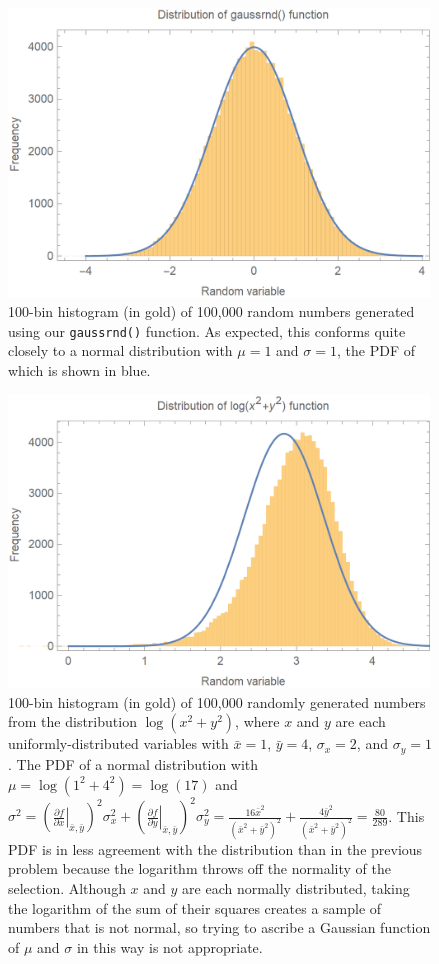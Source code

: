 \documentclass{article}
\begin{document}
\begin{figure}[H]
    \centering
    \includegraphics[width=4.4in]{homework7/normal_dist.png}
    \caption{100-bin histogram (in gold) of 100,000 random numbers generated using our \texttt{gaussrnd()} function. As expected, this conforms quite closely to a normal distribution with $\mu=1$ and $\sigma=1$, the PDF of which is shown in blue.}
    \label{fig:gaussrnd}
\end{figure}

\newpage

\bigskip
{}
\medskip

\begin{figure}[H]
    \centering
    \includegraphics[width=4.4in]{homework7/log_dist.png}
    \caption{100-bin histogram (in gold) of 100,000 randomly generated numbers from the distribution $\log(x^2+y^2)$, where $x$ and $y$ are each uniformly-distributed variables with $\bar{x}=1$, $\bar{y}=4$, $\sigma_x=2$, and $\sigma_y=1$. The PDF of a normal distribution with $\mu=\log(1^2+4^2)=\log(17)$ and $\displaystyle \sigma^2=\left(\left.\frac{\partial f}{\partial x}\right|_{\bar{x},\bar{y}}\right)^2\sigma_x^2 + \left(\left.\frac{\partial f}{\partial y}\right|_{\bar{x},\bar{y}}\right)^2\sigma_y^2 = \frac{16\bar{x}^2}{(\bar{x}^2+\bar{y}^2)^2}+\frac{4\bar{y}^2}{(\bar{x}^2+\bar{y}^2)^2}=\frac{80}{289}$. This PDF is in less agreement with the distribution than in the previous problem because the logarithm throws off the normality of the selection. Although $x$ and $y$ are each normally distributed, taking the logarithm of the sum of their squares creates a sample of numbers that is not normal, so trying to ascribe a Gaussian function of $\mu$ and $\sigma$ in this way is not appropriate.}
    \label{fig:logx2y2}
\end{figure}
\end{document}

